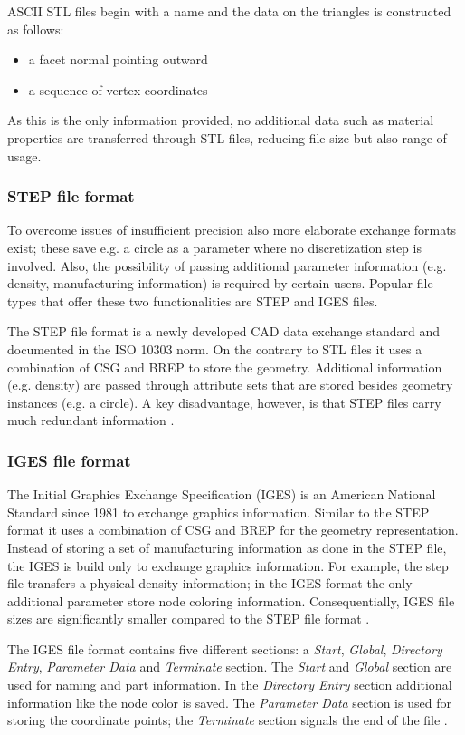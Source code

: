 ASCII STL files begin with a name and the data on the triangles is constructed as follows: 
\begin{itemize}
\item a facet normal pointing outward
\item a sequence of vertex coordinates
\end{itemize}
As this is the only information provided, no additional data such as material properties are transferred through STL files, reducing file size but also range of usage.
\subsubsection{STEP file format}
To overcome issues of insufficient precision also more elaborate exchange formats exist; these save e.g. a circle as a parameter where no discretization step is involved. Also, the possibility of passing additional parameter information (e.g. density, manufacturing information) is required by certain users. Popular file types that offer these two functionalities are STEP and IGES files. 

The STEP file format is a newly developed CAD data exchange standard and documented in the ISO 10303 norm. On the contrary to STL files it uses a combination of CSG and BREP to store the geometry. Additional information (e.g. density) are passed through attribute sets that are stored besides geometry instances (e.g. a circle). A key disadvantage, however, is that STEP files carry much redundant information \cite{STL}.
\subsubsection{IGES file format}
 The Initial Graphics Exchange Specification (IGES) is an American 
National Standard since 1981 to exchange graphics information. Similar to the STEP format it uses a combination of CSG and BREP for the geometry representation. Instead of storing a set of manufacturing information as done in the STEP file, the IGES is build only to exchange graphics information. For example, the step file transfers a physical density information; in the IGES format the only additional parameter store node coloring information. Consequentially, IGES file sizes are significantly smaller compared to the STEP file format \cite{STL}.

The IGES file format contains five different sections: a \emph{Start}, \emph{Global}, \emph{Directory Entry}, \emph{Parameter Data} and \emph{Terminate} section. The \emph{Start} and \emph{Global} section are used for naming and part information. In the \emph{Directory Entry} section additional information like the node color is saved. The \emph{Parameter Data} section is used for storing the coordinate points; the \emph{Terminate} section signals the end of the file \cite{sarcarCAD}.
